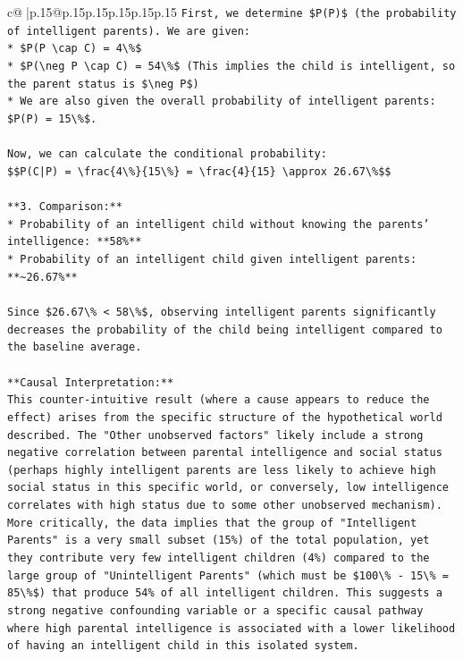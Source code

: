 \documentclass{article}
\begin{document}
{\begin{supertabular}{c@{$\;$}|p{.15\linewidth}@{}p{.15\linewidth}p{.15\linewidth}p{.15\linewidth}p{.15\linewidth}p{.15\linewidth}}
{{{\texttt{First, we determine \$P(P)\$ (the probability of intelligent parents). We are given:} \\
\texttt{*   \$P(P \textbackslash{}cap C) = 4\textbackslash{}\%\$} \\
\texttt{*   \$P(\textbackslash{}neg P \textbackslash{}cap C) = 54\textbackslash{}\%\$ (This implies the child is intelligent, so the parent status is \$\textbackslash{}neg P\$)} \\
\texttt{*   We are also given the overall probability of intelligent parents: \$P(P) = 15\textbackslash{}\%\$.} \\
\\ 
\texttt{Now, we can calculate the conditional probability:} \\
\texttt{\$\$P(C|P) = \textbackslash{}frac\{4\textbackslash{}\%\}\{15\textbackslash{}\%\} = \textbackslash{}frac\{4\}\{15\} \textbackslash{}approx 26.67\textbackslash{}\%\$\$} \\
\\ 
\texttt{**3. Comparison:**} \\
\texttt{*   Probability of an intelligent child without knowing the parents' intelligence: **58\%**} \\
\texttt{*   Probability of an intelligent child given intelligent parents: **\textasciitilde{}26.67\%**} \\
\\ 
\texttt{Since \$26.67\textbackslash{}\% < 58\textbackslash{}\%\$, observing intelligent parents significantly decreases the probability of the child being intelligent compared to the baseline average.} \\
\\ 
\texttt{**Causal Interpretation:**} \\
\texttt{This counter{-}intuitive result (where a cause appears to reduce the effect) arises from the specific structure of the hypothetical world described. The "Other unobserved factors" likely include a strong negative correlation between parental intelligence and social status (perhaps highly intelligent parents are less likely to achieve high social status in this specific world, or conversely, low intelligence correlates with high status due to some other unobserved mechanism). More critically, the data implies that the group of "Intelligent Parents" is a very small subset (15\%) of the total population, yet they contribute very few intelligent children (4\%) compared to the large group of "Unintelligent Parents" (which must be \$100\textbackslash{}\% {-} 15\textbackslash{}\% = 85\textbackslash{}\%\$) that produce 54\% of all intelligent children. This suggests a strong negative confounding variable or a specific causal pathway where high parental intelligence is associated with a lower likelihood of having an intelligent child in this isolated system.} \\
}}}
\end{supertabular}}
\end{document}
